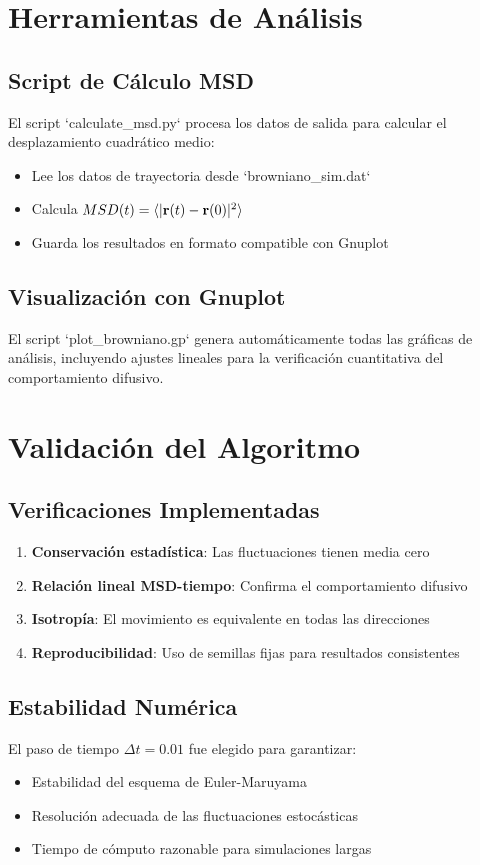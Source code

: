 \documentclass[11pt,a4paper]{article}
\begin{document}
\section{Herramientas de Análisis}

\subsection{Script de Cálculo MSD}
El script `calculate_msd.py` procesa los datos de salida para calcular el desplazamiento cuadrático medio:
\begin{itemize}
    \item Lee los datos de trayectoria desde `browniano_sim.dat`
    \item Calcula $MSD(t) = \langle |\vb{r}(t) - \vb{r}(0)|^2 \rangle$
    \item Guarda los resultados en formato compatible con Gnuplot
\end{itemize}

\subsection{Visualización con Gnuplot}
El script `plot_browniano.gp` genera automáticamente todas las gráficas de análisis, incluyendo ajustes lineales para la verificación cuantitativa del comportamiento difusivo.

\section{Validación del Algoritmo}

\subsection{Verificaciones Implementadas}
\begin{enumerate}
    \item \textbf{Conservación estadística}: Las fluctuaciones tienen media cero
    \item \textbf{Relación lineal MSD-tiempo}: Confirma el comportamiento difusivo
    \item \textbf{Isotropía}: El movimiento es equivalente en todas las direcciones
    \item \textbf{Reproducibilidad}: Uso de semillas fijas para resultados consistentes
\end{enumerate}

\subsection{Estabilidad Numérica}
El paso de tiempo $\Delta t = 0.01$ fue elegido para garantizar:
\begin{itemize}
    \item Estabilidad del esquema de Euler-Maruyama
    \item Resolución adecuada de las fluctuaciones estocásticas
    \item Tiempo de cómputo razonable para simulaciones largas
\end{itemize}
\end{document}
